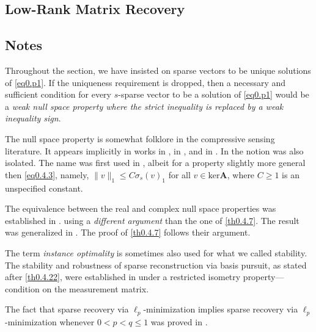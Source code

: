 \subsection{Low-Rank Matrix Recovery}

\subsection{Notes}

Throughout the section, we have insisted on sparse vectors to be unique solutions of \cref{eq0.p1}. If the uniqueness requirement is dropped, then a necessary and sufficient condition for every $s$-sparse vector to be a solution of \cref{eq0.p1} would be a \textcolor[rgb]{1,0,0}{\emph{weak null space property where the strict inequality is replaced by a weak inequality sign}}.

The null space property is somewhat folklore in the compressive sensing literature. It appears implicitly in works in \cite{Donoho2003}, in \cite{Donoho2001}, and in \cite{Elad2002}. In \cite{Gribonval2003} the notion was also isolated. The name was first used in \cite{Cohen2009}, albeit for a property slightly more general then \cref{eq0.4.3}, namely, $\|v\|_1 \leq C\sigma_s(v)_1$ for all $v \in \text{ker}\mathbf{A}$, where $C \geq 1$ is an unspecified constant. 

The equivalence between the real and complex null space properties was established in \cite{Foucart2010}. using a \emph{\textcolor[rgb]{1,0,0}{different argument}} than the one of \cref{th0.4.7}. The result was generalized in \cite{Lai2011}. The proof of \cref{th0.4.7} follows their argument.

The term \emph{\textcolor[rgb]{1,0,0}{instance optimality}} is sometimes also used for what we called stability. The stability and robustness of sparse reconstruction via basis pursuit, as stated after \cref{th0.4.22}, were established in \cite{Candes2006a} under a restricted isometry property---condition on the measurement matrix.

The fact that sparse recovery via $\ell_p$-minimization implies sparse recovery via $\ell_p$-minimization whenever $0<p<q\leq 1$ was proved in \cite{Gribonval2007}. 








